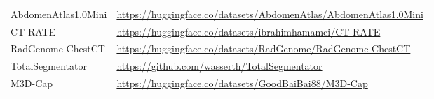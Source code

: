 \begin{table}[!htbp]
\begin{tabularx}{\linewidth}{@{}L{.28\linewidth}Y@{}}
AbdomenAtlas1.0Mini\newline\citep{li2024abdomenatlas} & \url{https://huggingface.co/datasets/AbdomenAtlas/AbdomenAtlas1.0Mini}\\
CT-RATE\newline\citep{hamamci2026ctrate} & \url{https://huggingface.co/datasets/ibrahimhamamci/CT-RATE}\\
RadGenome-ChestCT\newline\citep{zhang2025radgenome} & \url{https://huggingface.co/datasets/RadGenome/RadGenome-ChestCT}\\
TotalSegmentator\newline\citep{wasserthal2023totalsegmentator} & \url{https://github.com/wasserth/TotalSegmentator}\\
M3D-Cap\newline\citep{bai2024m3d} & \url{https://huggingface.co/datasets/GoodBaiBai88/M3D-Cap}\\
\bottomrule
\end{tabularx}
\end{table}
